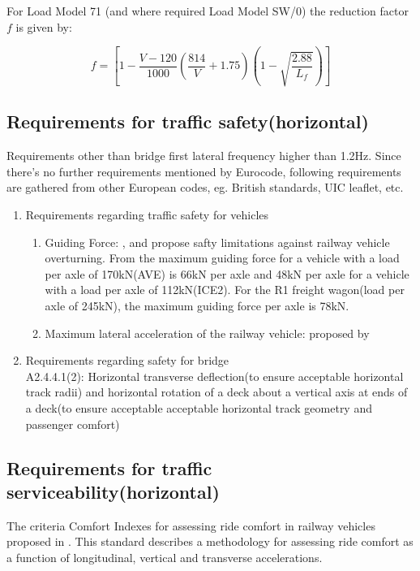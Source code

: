 For Load Model 71 (and where required Load Model SW/0) the reduction factor $f$ is given by:

\begin{equation}
	f=[1-\frac{V-120}{1000}(\frac{814}{V}+1.75)(1-\sqrt{\frac{2.88}{L_f}})]
\end{equation}

\subsection{Requirements for traffic safety(horizontal)}
Requirements other than bridge first lateral frequency higher than 1.2Hz. Since there's no further requirements mentioned by Eurocode, following requirements are gathered from other European codes, eg. British standards, UIC leaflet, etc.

\begin{enumerate}[-]
	\item Requirements regarding traffic safety for vehicles
	\begin{enumerate}
		\item Guiding Force: \cite{code2005518} , \cite{en200714363} and\cite{cuadrado2008analysis} propose safty limitations against railway vehicle overturning. From\cite{en200714363} the maximum guiding force for a vehicle with a load per axle of 170kN(AVE) is 66kN per axle and 48kN per axle for a vehicle with a load per axle of 112kN(ICE2). For the R1 freight wagon(load per axle of 245kN), the maximum guiding force per axle is 78kN.
		\item Maximum lateral acceleration of the railway vehicle: proposed by \cite{13803}
	\end{enumerate}
	\item Requirements regarding safety for bridge\\
	\cite{EC0} A2.4.4.1(2): Horizontal transverse deflection(to ensure acceptable horizontal track radii) and horizontal rotation of a deck about a vertical axis at ends of a deck(to ensure acceptable acceptable horizontal track geometry and passenger comfort)
\end{enumerate}





\subsection{Requirements for traffic serviceability(horizontal)}

The criteria Comfort Indexes for assessing ride comfort in railway vehicles proposed in \cite{12299}. This standard describes a methodology for assessing ride comfort as a function of longitudinal, vertical and transverse accelerations. 

